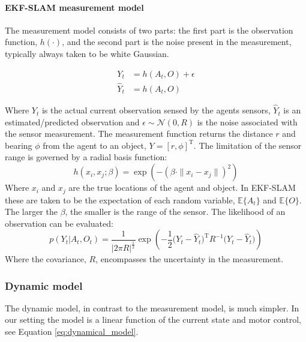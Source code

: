 \paragraph{EKF-SLAM measurement model}

The measurement model consists of two parts: the first part is the observation function, $h(\cdot)$, and the second part is the noise present in the measurement, 
typically always taken to be white Gaussian.

\begin{align}
  Y_t &= h(A_t,O) + \epsilon \\\nonumber
 \hat{Y}_t &= h(A_t,O)  
\end{align}

Where $Y_t$ is the actual current observation sensed by the agents sensors, $\hat{Y}_t$ is an estimated/predicted observation
and $\epsilon \sim \mathcal{N}(0,R)$ is the noise associated with the sensor measurement.
The measurement function returns the distance $r$ and bearing $\phi$ from the agent to an object, $Y = \left[r,\phi \right]^{\mathrm{T}}$. 
The limitation of the sensor range is governed by a radial basis function:
\begin{equation}\label{eq:ekf-measurement_function}
 h(x_i,x_j;\beta) = \exp\left(-\left( \beta \cdot \|x_i - x_j\| \right)^2 \right)
\end{equation}
Where $x_i$ and $x_j$ are the true locations of the agent and object. In EKF-SLAM these are taken to be the 
expectation of each random variable, $\mathbb{E}\{A_t\}$ and $\mathbb{E}\{O\}$. The larger the $\beta$, the smaller is the range of 
the sensor. The likelihood of an observation can be evaluated:
\begin{equation} \label{eq:lik-measurement}
   p(Y_t|A_t,O_t) = \frac{1}{|2\pi R|^{\frac{1}{2}}} \exp \left( -\frac{1}{2} \big(Y_t - \hat{Y}_t\big)^{\mathrm{T}}R^{-1}\big(Y_t - \hat{Y}_t\big) \right)
\end{equation}
Where the covariance, $R$, encompasses the uncertainty in the measurement. 

\subsubsection{Dynamic model}

\label{subsub:dynamic-model}
The dynamic model, in contrast to the measurement model, is much simpler. In our setting the model is a linear function of the 
current state and motor control, see Equation \ref{eq:dynamical_model}.


